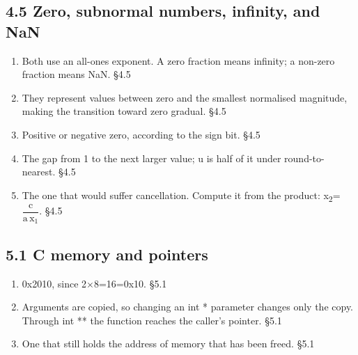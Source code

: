 \documentclass[11pt]{article}
\begin{document}
\begin{keepsection}\subsection{4.5 Zero, subnormal numbers, infinity, and NaN}

\begin{enumerate}
\item Both use an all-ones exponent. A zero fraction means infinity; a non-zero fraction means NaN. \hfill{\small\color{FAUblue}§4.5}
\item They represent values between zero and the smallest normalised magnitude, making the transition toward zero gradual. \hfill{\small\color{FAUblue}§4.5}
\item Positive or negative zero, according to the sign bit. \hfill{\small\color{FAUblue}§4.5}
\item The gap from 1 to the next larger value; u is half of it under round-to-nearest. \hfill{\small\color{FAUblue}§4.5}
\item The one that would suffer cancellation. Compute it from the product: x\textsubscript{2}={\small\ensuremath{\dfrac{\mathrm{c}}{\mathrm{a}\, \mathrm{x}_{1}}}}. \hfill{\small\color{FAUblue}§4.5}
\end{enumerate}

\end{keepsection}
\begin{keepsection}\subsection{5.1 C memory and pointers}

\begin{enumerate}
\item 0x2010, since 2\ensuremath{\times}8=16=0x10. \hfill{\small\color{FAUblue}§5.1}
\item Arguments are copied, so changing an int * parameter changes only the copy. Through int ** the function reaches the caller’s pointer. \hfill{\small\color{FAUblue}§5.1}
\item One that still holds the address of memory that has been freed. \hfill{\small\color{FAUblue}§5.1}
\end{enumerate}

\end{keepsection}
\end{document}
